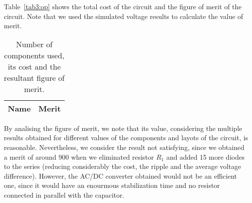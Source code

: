 Table~\ref{tab3:op} shows the total cost of the circuit and the figure of merit of the circuit. 
Note that we used the simulated voltage results to calculate the value of merit.


\begin{table}[H]
  \centering
  \begin{tabular}{|l|r|}
    \hline    
    {\bf Name} & {\bf Merit} \\ \hline
    
  \end{tabular}
  \caption{Number of components used, its cost and the resultant figure of merit.}
  \label{tab2:op}
\end{table}

By analising the figure of merit, we note that its value, considering the multiple results obtained for different values of the components and layots of the circuit, is
reasonable. Nevertheless, we consider the result not satisfying, since we obtained a merit of around 900 when we eliminated resistor $R_1$ and added 15 more diodes to the series
(reducing considerably the cost, the ripple and the average voltage difference). However, the AC/DC converter obtained would not be an efficient one, since it would have an enourmous
stabilization time and no resistor connected in parallel with the capacitor.

